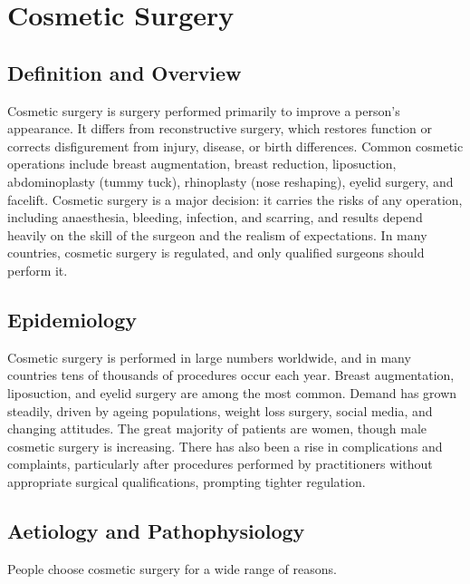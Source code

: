 \chapter{Cosmetic Surgery}

\section*{Definition and Overview}
Cosmetic surgery is surgery performed primarily to improve a person's appearance. It differs from reconstructive surgery, which restores function or corrects disfigurement from injury, disease, or birth differences. Common cosmetic operations include breast augmentation, breast reduction, liposuction, abdominoplasty (tummy tuck), rhinoplasty (nose reshaping), eyelid surgery, and facelift. Cosmetic surgery is a major decision: it carries the risks of any operation, including anaesthesia, bleeding, infection, and scarring, and results depend heavily on the skill of the surgeon and the realism of expectations. In many countries, cosmetic surgery is regulated, and only qualified surgeons should perform it.

\section*{Epidemiology}
Cosmetic surgery is performed in large numbers worldwide, and in many countries tens of thousands of procedures occur each year. Breast augmentation, liposuction, and eyelid surgery are among the most common. Demand has grown steadily, driven by ageing populations, weight loss surgery, social media, and changing attitudes. The great majority of patients are women, though male cosmetic surgery is increasing. There has also been a rise in complications and complaints, particularly after procedures performed by practitioners without appropriate surgical qualifications, prompting tighter regulation.

\section*{Aetiology and Pathophysiology}
People choose cosmetic surgery for a wide range of reasons.

